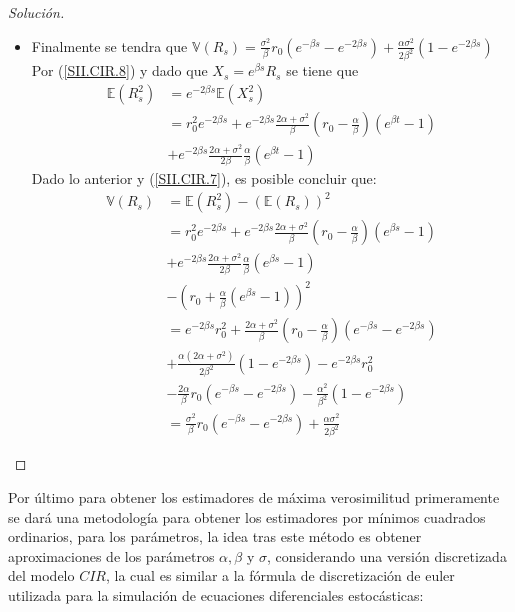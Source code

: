 \documentclass[11pt,notitlepage]{article}
\newenvironment{solucion}
  {\begin{proof}[Solución]}
  {\end{proof}}
\begin{document}
\begin{solucion}
\begin{itemize}
        \item Finalmente se tendra que \(\mathbb{V}(R_s) = \frac{\sigma^2}{\beta}r_0\left(e^{-\beta s} - e^{-2\beta s} \right) + \frac{\alpha\sigma^2}{2\beta^2}
             \left(1 - e^{-2\beta s}\right)\)\\
            Por (\ref{SII.CIR.8}) y dado que \(X_s = e^{\beta s}R_s\) se tiene que 
            \begin{align*}
            \mathbb{E}(R_{s}^2) &= e^{-2\beta s}\mathbb{E}(X_{s}^2)\\
                                &= r_{0}^2e^{-2\beta s} + e^{-2\beta s}\frac{2\alpha + \sigma^2}{\beta}\left(r_0 - \frac{\alpha}{\beta}\right)\left(e^{\beta t} -1\right)\\
                                &+ e^{-2\beta s} \frac{2\alpha + \sigma^2}{2\beta}\frac{\alpha}{\beta}\left(e^{\beta t} -1\right)
            \end{align*}
        Dado lo anterior y (\ref{SII.CIR.7}), es posible concluir que:
        \begin{align*}
        \mathbb{V}(R_s) &= \mathbb{E}(R_{s}^2) - (\mathbb{E}(R_{s}))^2 \\
                        &= r_{0}^2e^{-2\beta s} + e^{-2\beta s}\frac{2\alpha + \sigma^2}{\beta}\left(r_0 - \frac{\alpha}{\beta}\right)\left(e^{\beta s} -1\right)\\
                        &+ e^{-2\beta s} \frac{2\alpha + \sigma^2}{2\beta}\frac{\alpha}{\beta}\left(e^{\beta s} -1\right)\\
                        &-\left( r_0 +\frac{\alpha}{\beta}\left(e^{\beta s} - 1 \right)\right)^2\\
                        &=e^{-2\beta s}r_{0}^2+\frac{2\alpha + \sigma^2}{\beta}\left(r_0 - \frac{\alpha}{\beta}\right)\left(e^{-\beta s} - e^{-2 \beta s}\right)\\ 
                        &+\frac{\alpha(2\alpha + \sigma^2)}{2\beta^2}(1 - e^{-2\beta s})- e^{-2\beta s}r_{0}^2\\
                        &- \frac{2\alpha}{\beta}r_0\left(e^{-\beta s} - e^{-2\beta s}\right) - \frac{\alpha^2}{\beta^2}\left(1-e^{-2 \beta s}\right)\\
                        &= \frac{\sigma^2}{\beta}r_0\left(e^{-\beta s} - e^{-2\beta s} \right) + \frac{\alpha\sigma^2}{2\beta^2}
        \end{align*}
        \end{itemize}
        \end{solucion}
        Por último para obtener los estimadores de máxima verosimilitud primeramente se dará una metodología para obtener los estimadores por mínimos cuadrados ordinarios, para los parámetros, la idea tras este método es obtener aproximaciones de los parámetros \(\alpha,\beta\) y \(\sigma\), considerando una versión discretizada del modelo \(CIR\), la cual es similar a la fórmula de discretización de euler utilizada para la simulación de ecuaciones diferenciales estocásticas:
\end{document}

